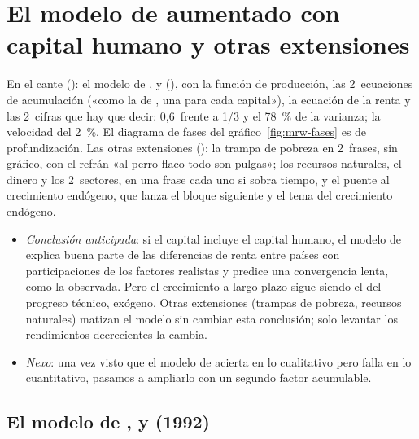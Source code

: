 \documentclass[11pt]{article}
\begin{document}
\section{El modelo de  aumentado con capital humano\cortetitulo{} y otras extensiones}\label{sec:mrw}

\begin{notaopositor}
En el cante (): el modelo de ,  y  (), con la función de producción, las 2~ecuaciones de acumulación («como la de , una para cada capital»), la ecuación de la renta y las 2~cifras que hay que decir: 0,6~frente a 1/3 y el 78~\% de la varianza; la velocidad del 2~\%. El diagrama de fases del gráfico~\ref{fig:mrw-fases} es de profundización. Las otras extensiones (): la trampa de pobreza en 2~frases, sin gráfico, con el refrán «al perro flaco todo son pulgas»; los recursos naturales, el dinero y los 2~sectores, en una frase cada uno si sobra tiempo, y el puente al crecimiento endógeno, que lanza el bloque siguiente y el tema del crecimiento endógeno.
\end{notaopositor}

\begin{itemize}
\item \emph{Conclusión anticipada}: si el capital incluye el capital humano, el modelo de  explica buena parte de las diferencias de renta entre países con participaciones de los factores realistas y predice una convergencia lenta, como la observada. Pero el crecimiento a largo plazo sigue siendo el del progreso técnico, exógeno. Otras extensiones (trampas de pobreza, recursos naturales) matizan el modelo sin cambiar esta conclusión; solo levantar los rendimientos decrecientes la cambia.
\item \emph{Nexo}: una vez visto que el modelo de  acierta en lo cualitativo pero falla en lo cuantitativo, pasamos a ampliarlo con un segundo factor acumulable.
\end{itemize}

\subsection{El modelo de ,  y  (1992)}\label{sec:mrw-modelo}
\end{document}
